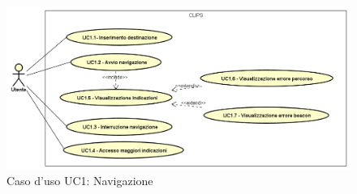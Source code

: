 \documentclass[../AnalisiDeiRequisiti.tex]{subfiles}
\begin{document}
        \begin{figure}[H]
            \centering
            \includegraphics[scale=0.95, width=\textwidth]{img/UC1.png}
            \caption{Caso d'uso UC1: Navigazione}\label{fig:UC1} 
        \end{figure}
\end{document}
